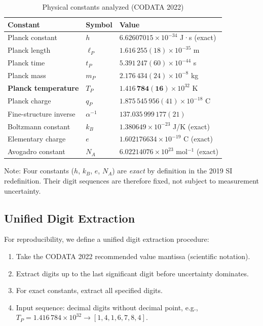 \documentclass[twocolumn,showpacs,preprintnumbers,amsmath,amssymb,prl]{revtex4-2}
\begin{document}
\begin{table}[h]
\centering
\caption{Physical constants analyzed (CODATA 2022)}
\label{tab:constants}
\begin{tabular}{@{}lll@{}}
\toprule
Constant & Symbol & Value \\
\midrule
Planck constant & $h$ & $6.62607015 \times 10^{-34}$ J·s (exact) \\
Planck length & $\ell_P$ & $1.616\,255(18) \times 10^{-35}$ m \\
Planck time & $t_P$ & $5.391\,247(60) \times 10^{-44}$ s \\
Planck mass & $m_P$ & $2.176\,434(24) \times 10^{-8}$ kg \\
\textbf{Planck temperature} & $T_P$ & $\mathbf{1.416\,784(16)} \times 10^{32}$ K \cite{nist_tp} \\
Planck charge & $q_P$ & $1.875\,545\,956(41) \times 10^{-18}$ C \\
Fine-structure inverse & $\alpha^{-1}$ & $137.035\,999\,177(21)$ \cite{nist_alpha} \\
Boltzmann constant & $k_B$ & $1.380649 \times 10^{-23}$ J/K (exact) \\
Elementary charge & $e$ & $1.602176634 \times 10^{-19}$ C (exact) \\
Avogadro constant & $N_A$ & $6.02214076 \times 10^{23}$ mol$^{-1}$ (exact) \\
\bottomrule
\end{tabular}
\end{table}

Note: Four constants ($h$, $k_B$, $e$, $N_A$) are \textit{exact} by definition in the 2019 SI redefinition. Their digit sequences are therefore fixed, not subject to measurement uncertainty.

\subsection{Unified Digit Extraction}

For reproducibility, we define a unified digit extraction procedure:
\begin{enumerate}
    \item Take the CODATA 2022 recommended value mantissa (scientific notation).
    \item Extract digits up to the last significant digit before uncertainty dominates.
    \item For exact constants, extract all specified digits.
    \item Input sequence: decimal digits without decimal point, e.g., $T_P = 1.416\,784 \times 10^{32} \to [1,4,1,6,7,8,4]$.
\end{enumerate}
\end{document}
